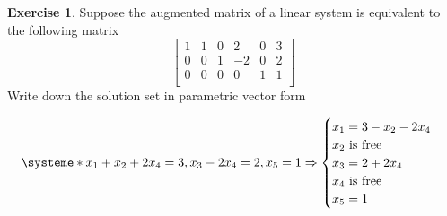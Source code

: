 \documentclass{beamer}
\theoremstyle{definition}
\newtheorem{exercise}[theorem]{Exercise}
\theoremstyle{remark}
\begin{document}
\begin{frame}[t]
\begin{exercise}
Suppose the augmented matrix of a linear system is equivalent to the following matrix
\[
\begin{bmatrix}
1&1&0&2&0&3\\
0&0&1&-2&0&2\\
0&0&0&0&1&1\\
\end{bmatrix}
\]
Write down the solution set in parametric vector form
\end{exercise}
\pause
\begin{solution}
\[
\systeme*{x_1+x_2+2x_4=3, x_3-2x_4=2,x_5=1}\Rightarrow\begin{cases}
x_1=3-x_2-2x_4\\ x_2\text{ is free}\\x_3=2+2x_4\\ x_4\text{ is free}\\ x_5=1
\end{cases}
\]
\end{solution}
\end{frame}
\end{document}
